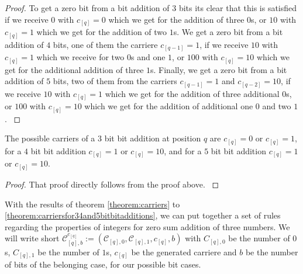 \begin{proof}
    To get a zero bit from a bit addition of $3$ bits its clear that this is satisfied if we receive $0$ with $c_{[q]} = 0$ which we get for the addition of three $0$s, or $10$ with $c_{[q]} = 1$ which we get for the addition of two $1$s. We get a zero bit from a bit addition of $4$ bits, one of them the carriere $c_{[q-1]} = 1$, if we receive $10$ with $c_{[q]} = 1$ which we receive for two $0$s and one $1$, or $100$ with $c_{[q]} = 10$ which we get for the additional addition of three $1$s. Finally, we get a zero bit from a bit addition of $5$ bits, two of them from the carriers $c_{[q-1]} = 1$ and $c_{[q-2]} = 10$, if we receive $10$ with $c_{[q]} = 1$ which we get for the addition of three additional $0$s, or $100$ with $c_{[q]} = 10$ which we get for the addition of additional one $0$ and two $1$.
\label{proof:numberof0sand1sinintegersforzerosum}
\end{proof}


\begin{theorem}
    The possible carriers of a $3$ bit bit addition at position $q$ are $c_{[q]} = 0$ or $c_{[q]} = 1$, for a $4$ bit bit addition $c_{[q]} = 1$ or $c_{[q]} = 10$, and for a $5$ bit bit addition $c_{[q]} = 1$ or $c_{[q]} = 10$.
\label{theorem:carriersfor34and5bitbitadditions}
\end{theorem}

\begin{proof}
    That proof directly follows from the proof above.
\label{proof:carriersfor34and5bitbitadditions}
\end{proof}

With the results of theorem \ref{theorem:carriers} to \ref{theorem:carriersfor34and5bitbitadditions}, we can put together a set of rules regarding the properties of integers for zero sum addition of three numbers. We will write short $\mathcal{C}^{c_{[q]}}_{[q],b} := \left(\mathcal{C}_{[q],0}, \mathcal{C}_{[q],1}, c_{[q]}, b\right)$ with $C_{[q],0}$ be the number of $0$s, $C_{[q],1}$ be the number of $1$s, $c_{[q]}$ be the generated carriere and $b$ be the number of bits of the belonging case, for our possible bit cases.


